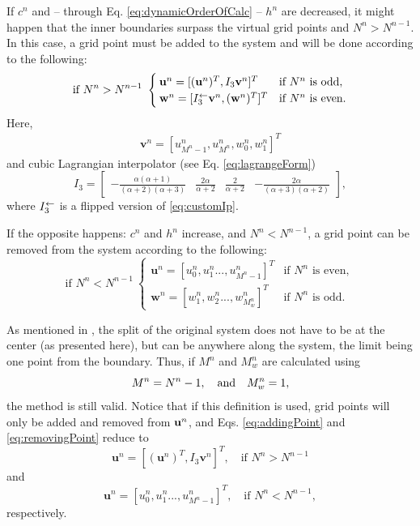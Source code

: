 If $c^n$ and -- through Eq. \eqref{eq:dynamicOrderOfCalc} -- $h^n$ are decreased, it might happen that the inner boundaries surpass the virtual grid points and $N^n > N^{n-1}$. In this case, a grid point must be added to the system and will be done according to the following:
\begin{equation}\label{eq:addingPoint}
    \text{if } N^n>N^{n-1}\ \begin{cases}\mathbf{u}^n = [(\mathbf{u}^n)^T, I_3\mathbf{v}^n]^T & \text{if $N^n $ is odd},\\
    \mathbf{w}^n = [I_3^\leftarrow\mathbf{v}^n, (\mathbf{w}^n)^T]^T & \text{if $ N^n$ is even}.
    \end{cases}
\end{equation}
Here, 
\begin{align*}
\mathbf{v}^n = [u_{M^n-1}^n, u_{M^n}^n, w_0^n, w_1^n]^T%
\end{align*}
and cubic Lagrangian interpolator (see Eq. \eqref{eq:lagrangeForm})
\begin{equation}\label{eq:customIp}
I_3 = \begin{bmatrix} -\frac{\alpha(\alpha+1)}{(\alpha+2)(\alpha+3)} &\frac{2\alpha}{\alpha+2} &\frac{2}{\alpha+2} 
&-\frac{2\alpha}{(\alpha+3)(\alpha+2)}
\end{bmatrix},
\end{equation}
where $I_3^\leftarrow$ is a flipped version of \eqref{eq:customIp}.

If the opposite happens: $c^n$ and $h^n$ increase, and $N^n<N^{n-1}$, a grid point can be removed from the system according to the following:
\begin{equation}\label{eq:removingPoint}
\text{if } N^n<N^{n-1}\ \begin{cases}
    \mathbf{u}^n = [u_0^n, u_1^n ..., u_{M^n-1}^n]^T & \text{if $N^n$ is even}, \\
        \mathbf{w}^n = [w_1^n, w_2^n ..., w_{M_w^n}^n]^T & \text{if $N^n$ is odd}.
    \end{cases}
\end{equation}

As mentioned in \citeP[G], the split of the original system  does not have to be at the center (as presented here), but can be anywhere along the system, the limit being one point from the boundary. Thus, if $M^n$ and $M_w^n$ are calculated using 
\begin{equation} \label{eq:alternativeM}
    M^n = N^n - 1,\quad \text{and} \quad  M_w^n= 1,
\end{equation}
the method is still valid. Notice that if this definition is used, grid points will only be added and removed from $\mathbf{u}^n$, and Eqs. \eqref{eq:addingPoint} and \eqref{eq:removingPoint} reduce to
\begin{equation}\label{eq:alternativeAddingPoint}
    \mathbf{u}^n = [(\mathbf{u}^n)^T, I_3\mathbf{v}^n]^T,\quad \text{if } N^n>N^{n-1}
\end{equation}
and 
\begin{equation}
    \mathbf{u}^n = [u_0^n, u_1^n ..., u_{M^n-1}^n]^T,\quad \text{if } N^n<N^{n-1},
\end{equation}
respectively.
